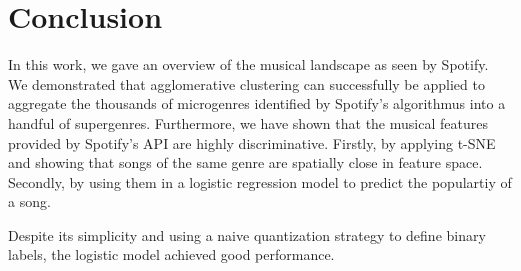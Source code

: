 \documentclass{article}
\begin{document}
  

\section{Conclusion}

In this work, we gave an overview of the musical landscape as seen by Spotify. We demonstrated that agglomerative clustering can successfully be applied to aggregate the thousands of microgenres identified by Spotify's algorithmus into a handful of supergenres. Furthermore, we have shown that the musical features provided by Spotify's API are highly discriminative. Firstly, by applying t-SNE and showing that songs of the same genre are spatially close in  feature space. Secondly, by using them in a logistic regression model to predict the populartiy of a song.

Despite its simplicity and using a naive quantization strategy to define binary labels, the logistic model achieved good performance. 


\end{document}
